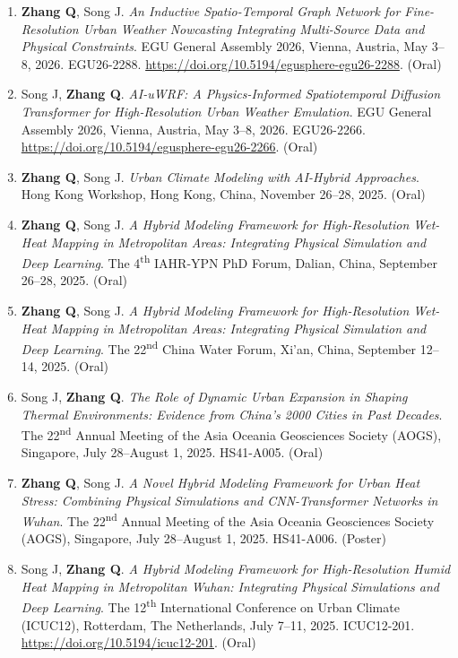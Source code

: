 \documentclass[10pt,a4paper]{article}
\begin{document}
\begin{enumerate}[leftmargin=22pt]
    \item \textbf{Zhang Q}, Song J. \textit{An Inductive Spatio-Temporal Graph Network for Fine-Resolution Urban Weather Nowcasting Integrating Multi-Source Data and Physical Constraints}. EGU General Assembly 2026, Vienna, Austria, May 3--8, 2026. EGU26-2288. \url{https://doi.org/10.5194/egusphere-egu26-2288}. (Oral)

    \item Song J, \textbf{Zhang Q}. \textit{AI-uWRF: A Physics-Informed Spatiotemporal Diffusion Transformer for High-Resolution Urban Weather Emulation}. EGU General Assembly 2026, Vienna, Austria, May 3--8, 2026. EGU26-2266. \url{https://doi.org/10.5194/egusphere-egu26-2266}. (Oral)

    \item \textbf{Zhang Q}, Song J. \textit{Urban Climate Modeling with AI-Hybrid Approaches}. Hong Kong Workshop, Hong Kong, China, November 26--28, 2025. (Oral)

    \item \textbf{Zhang Q}, Song J. \textit{A Hybrid Modeling Framework for High-Resolution Wet-Heat Mapping in Metropolitan Areas: Integrating Physical Simulation and Deep Learning}. The 4\textsuperscript{th} IAHR-YPN PhD Forum, Dalian, China, September 26--28, 2025. (Oral)

    \item \textbf{Zhang Q}, Song J. \textit{A Hybrid Modeling Framework for High-Resolution Wet-Heat Mapping in Metropolitan Areas: Integrating Physical Simulation and Deep Learning}. The 22\textsuperscript{nd} China Water Forum, Xi'an, China, September 12--14, 2025. (Oral)

    \item Song J, \textbf{Zhang Q}. \textit{The Role of Dynamic Urban Expansion in Shaping Thermal Environments: Evidence from China's 2000 Cities in Past Decades}. The 22\textsuperscript{nd} Annual Meeting of the Asia Oceania Geosciences Society (AOGS), Singapore, July 28--August 1, 2025. HS41-A005. (Oral)

    \item \textbf{Zhang Q}, Song J. \textit{A Novel Hybrid Modeling Framework for Urban Heat Stress: Combining Physical Simulations and CNN-Transformer Networks in Wuhan}. The 22\textsuperscript{nd} Annual Meeting of the Asia Oceania Geosciences Society (AOGS), Singapore, July 28--August 1, 2025. HS41-A006. (Poster)

    \item Song J, \textbf{Zhang Q}. \textit{A Hybrid Modeling Framework for High-Resolution Humid Heat Mapping in Metropolitan Wuhan: Integrating Physical Simulations and Deep Learning}. The 12\textsuperscript{th} International Conference on Urban Climate (ICUC12), Rotterdam, The Netherlands, July 7--11, 2025. ICUC12-201. \url{https://doi.org/10.5194/icuc12-201}. (Oral)


\end{enumerate}
\end{document}
